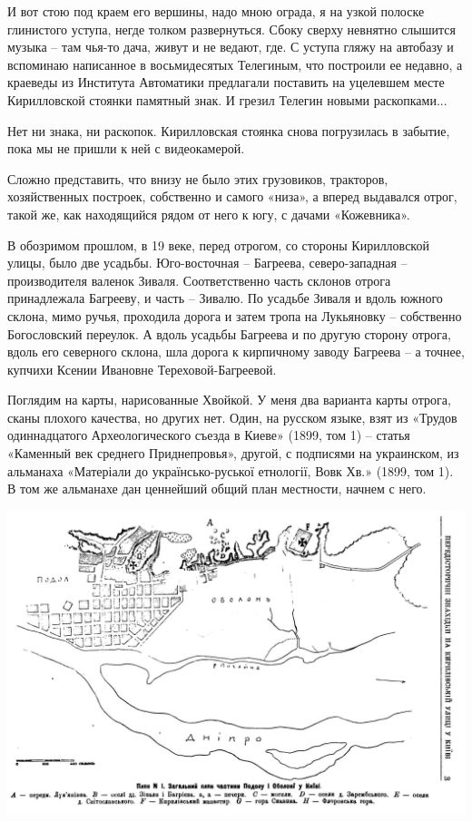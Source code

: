 И вот стою под краем его вершины, надо мною ограда, я на узкой полоске глинистого уступа, негде толком развернуться. Сбоку сверху невнятно слышится музыка – там чья-то дача, живут и не ведают, где. С уступа гляжу на автобазу и вспоминаю написанное в восьмидесятых Телегиным, что построили ее недавно, а краеведы из Института Автоматики предлагали поставить на уцелевшем месте Кирилловской стоянки памятный знак. И грезил Телегин новыми раскопками... 
 
Нет ни знака, ни раскопок. Кирилловская стоянка снова погрузилась в забытие, пока мы не пришли к ней с видеокамерой.

Сложно представить, что внизу не было этих грузовиков, тракторов, хозяйственных построек, собственно и самого «низа», а вперед выдавался отрог, такой же, как находящийся рядом от него к югу, с дачами «Кожевника».

В обозримом прошлом, в 19 веке, перед отрогом, со стороны Кирилловской улицы, было две усадьбы. Юго-восточная – Багреева, северо-западная – производителя валенок Зиваля. Соответственно часть склонов отрога принадлежала Багрееву, и часть – Зивалю. По усадьбе Зиваля и вдоль южного склона, мимо ручья, проходила дорога и затем  тропа на Лукьяновку – собственно Богословский переулок. А вдоль усадьбы Багреева и по другую сторону отрога, вдоль его северного склона, шла дорога к кирпичному заводу Багреева – а точнее, купчихи Ксении Ивановне Тереховой-Багреевой.

Поглядим на карты, нарисованные Хвойкой. У меня два варианта карты отрога, сканы плохого качества, но других нет. Один, на русском языке, взят из «Трудов одиннадцатого Археологического съезда в Киеве» (1899, том 1) – статья «Каменный век среднего Приднепровья», другой, с подписями на украинском, из альманаха «Матеріали до українсько-руської етнології, Вовк Хв.» (1899, том 1). В том же альманахе дан ценнейший общий план местности, начнем с него.

\begin{center}
\includegraphics[width=\linewidth]{chast-kirvys/kirstoy/1893-hvoyka-main.jpg}
\end{center}

